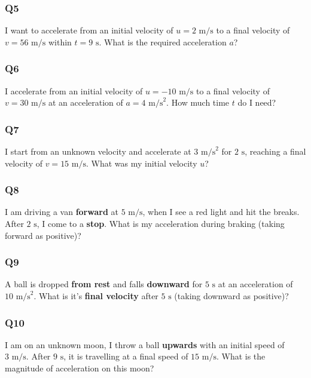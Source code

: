 \documentclass{article}
\begin{document}
\subsubsection{Q5}
I want to accelerate from an initial velocity of $u=2\text{ m/s}$ to a final velocity of $v=56\text{ m/s}$ within $t=9\text{ s}$. What is the required acceleration $a$? \\[50pt]
\subsubsection{Q6}
I accelerate from an initial velocity of $u=-10\text{ m/s}$ to a final velocity of $v=30\text{ m/s}$ at an acceleration of $a=4\text{ m/s}^2$. How much time $t$ do I need? \\[50pt]

\subsubsection{Q7}
I start from an unknown velocity and accelerate at $3\text{ m/s}^2$ for $2\text{ s}$, reaching a final velocity of $v=15\text{ m/s}$. What was my initial velocity $u$? \\[50pt]

\subsubsection{Q8}
I am driving a van \textbf{forward} at $5 \text{ m/s}$, when I see a red light and hit the breaks. After $2\text{ s}$, I come to a \textbf{stop}. What is my acceleration during braking (taking forward as positive)? \\[50pt]

\subsubsection{Q9}
A ball is dropped \textbf{from rest} and falls \textbf{downward} for $5\text{ s}$ at an acceleration of $10\text{ m/s}^2$. What is it's \textbf{final velocity} after $5 \text{ s}$ (taking downward as positive)?\\[50pt]

\subsubsection{Q10}
I am on an unknown moon, I throw a ball \textbf{upwards} with an initial speed of $3\text{ m/s}$. After $9 \text{ s}$, it is travelling  at a final speed of $15\text{ m/s}$. What is the magnitude of acceleration on this moon?\\[50pt]
\end{document}
